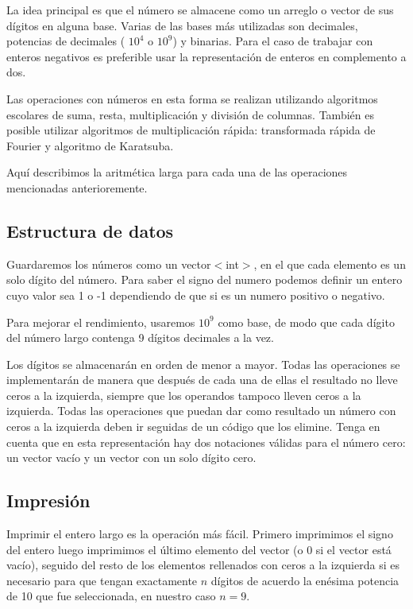 La idea principal es que el número se almacene como un arreglo o vector de sus 
dígitos en alguna base. Varias de las bases más utilizadas son decimales, potencias 
de decimales ( $10^4$ o $10^9$) y binarias. Para el caso de trabajar con enteros 
negativos es preferible usar la representación de enteros en complemento a dos.

Las operaciones con números en esta forma se realizan utilizando algoritmos escolares de suma, resta, multiplicación y división de columnas. También es posible utilizar algoritmos de multiplicación rápida: transformada rápida de Fourier y algoritmo de Karatsuba.

Aquí describimos la aritmética larga para cada una de las operaciones mencionadas anterioremente.

\subsection{Estructura de datos}

Guardaremos los números como un vector$<$int$>$, en el que cada elemento es un solo dígito del número. Para saber el signo del numero podemos definir un entero cuyo valor sea 1 o -1 dependiendo de que si es un numero positivo o negativo.

Para mejorar el rendimiento, usaremos $10^9$ como base, de modo que cada dígito del número largo contenga 9 dígitos decimales a la vez.

Los dígitos se almacenarán en orden de menor a mayor. Todas las operaciones se implementarán de manera que después de cada una de ellas el resultado no lleve ceros a la izquierda, siempre que los operandos tampoco lleven ceros a la izquierda. Todas las operaciones que puedan dar como resultado un número con ceros a la izquierda deben ir seguidas de un código que los elimine. Tenga en cuenta que en esta representación hay dos notaciones válidas para el número cero: un vector vacío y un vector con un solo dígito cero.

\subsection{Impresión}

Imprimir el entero largo es la operación más fácil. Primero imprimimos el signo del entero luego imprimimos el último elemento del vector (o 0 si el vector está vacío), seguido del resto de los elementos rellenados con ceros a la izquierda si es necesario para que tengan exactamente $n$ dígitos de acuerdo la enésima potencia de 10 que fue seleccionada, en nuestro caso $n=9$.



